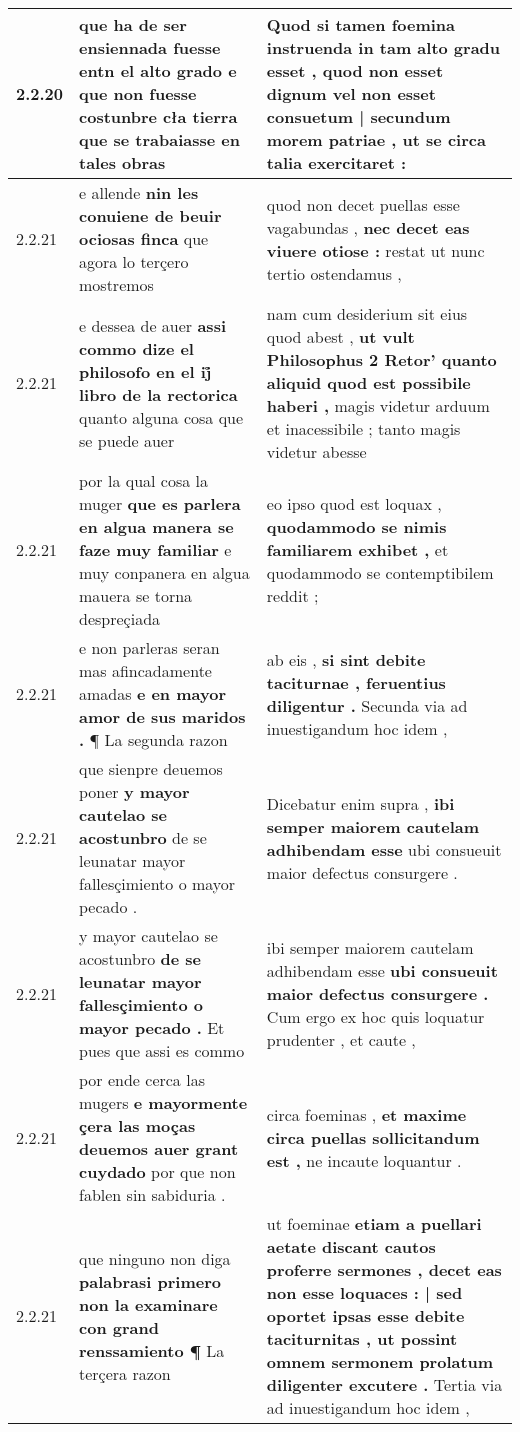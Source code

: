 \begin{tabular}{|p{1cm}|p{6.5cm}|p{6.5cm}|}
2.2.20 & que ha de ser ensiennada fuesse entn el alto grado \textbf{ e que non fuesse costunbre cła tierra } que se trabaiasse en tales obras & Quod si tamen foemina instruenda in tam alto gradu esset , \textbf{ quod non esset dignum vel non esset consuetum | secundum morem patriae , } ut se circa talia exercitaret : \\\hline
2.2.21 & e allende \textbf{ nin les conuiene de beuir ociosas finca } que agora lo terçero mostremos & quod non decet puellas esse vagabundas , \textbf{ nec decet eas viuere otiose : } restat ut nunc tertio ostendamus , \\\hline
2.2.21 & e dessea de auer \textbf{ assi commo dize el philosofo en el ij̊ libro de la rectorica } quanto alguna cosa que se puede auer & nam cum desiderium sit eius quod abest , \textbf{ ut vult Philosophus 2 Retor’ quanto aliquid quod est possibile haberi , } magis videtur arduum et inacessibile ; tanto magis videtur abesse \\\hline
2.2.21 & por la qual cosa la muger \textbf{ que es parlera en algua manera se faze muy familiar } e muy conpanera en algua mauera se torna despreçiada & eo ipso quod est loquax , \textbf{ quodammodo se nimis familiarem exhibet , } et quodammodo se contemptibilem reddit ; \\\hline
2.2.21 & e non parleras seran mas afincadamente amadas \textbf{ e en mayor amor de sus maridos . } ¶ La segunda razon & ab eis , \textbf{ si sint debite taciturnae , feruentius diligentur . } Secunda via ad inuestigandum hoc idem , \\\hline
2.2.21 & que sienpre deuemos poner \textbf{ y mayor cautelao se acostunbro } de se leunatar mayor fallesçimiento o mayor pecado . & Dicebatur enim supra , \textbf{ ibi semper maiorem cautelam adhibendam esse } ubi consueuit maior defectus consurgere . \\\hline
2.2.21 & y mayor cautelao se acostunbro \textbf{ de se leunatar mayor fallesçimiento o mayor pecado . } Et pues que assi es commo & ibi semper maiorem cautelam adhibendam esse \textbf{ ubi consueuit maior defectus consurgere . } Cum ergo ex hoc quis loquatur prudenter , et caute , \\\hline
2.2.21 & por ende cerca las mugers \textbf{ e mayormente çera las moças deuemos auer grant cuydado } por que non fablen sin sabiduria . & circa foeminas , \textbf{ et maxime circa puellas sollicitandum est , } ne incaute loquantur . \\\hline
2.2.21 & que ninguno non diga \textbf{ palabrasi primero non la examinare con grand renssamiento ¶ } La terçera razon & ut foeminae \textbf{ etiam a puellari aetate discant cautos proferre sermones , decet eas non esse loquaces : | sed oportet ipsas esse debite taciturnitas , ut possint omnem sermonem prolatum diligenter excutere . } Tertia via ad inuestigandum hoc idem , \\\hline

\end{tabular}

